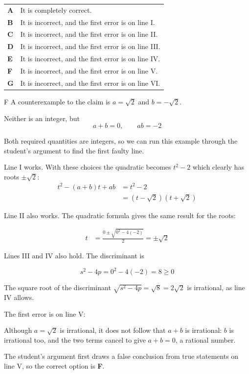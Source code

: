 \documentclass[11pt,a4paper]{article}
\begin{document}
\begin{enumerate}[label=\textbf{\arabic*.},leftmargin=*,itemsep=0pt,start=6]
\par\vspace*{12pt}
\begin{tabularx}{\linewidth}{@{}>{\bfseries}l Y@{}}
A &
It is completely correct.
\\[0.8em]
B &
It is incorrect, and the first error is on line I.
\\[0.8em]
C &
It is incorrect, and the first error is on line II.
\\[0.8em]
D &
It is incorrect, and the first error is on line III.
\\[0.8em]
E &
It is incorrect, and the first error is on line IV.
\\[0.8em]
F &
It is incorrect, and the first error is on line V.
\\[0.8em]
G &
It is incorrect, and the first error is on line VI.
\\
\end{tabularx}

\begin{djsSolution}{F}
A counterexample to the claim is $a=\sqrt2$ and $b=-\sqrt2$. 

Neither is an integer, but
\[
a+b=0,\qquad ab=-2
\]

Both required quantities are integers, so we can run this example through the student's argument to find the first faulty line.

Line I works. With these choices the quadratic becomes $t^2-2$ which clearly has roots $\pm\sqrt2$:
\begin{align*}
t^2-(a+b)t+ab&=t^2-2\\&=(t-\sqrt2)(t+\sqrt2)
\end{align*}

Line II also works. The quadratic formula gives the same result for the roots:

\begin{align*}
t&=\frac{0\pm\sqrt{0^2-4(-2)}}{2}=\pm\sqrt2
\end{align*}

Lines III and IV also hold. The discriminant is

\[
s^2-4p=0^2-4(-2)=8\geq0
\]

The square root of the discriminant \(\sqrt{s^2-4p} = \sqrt8=2\sqrt2 \) is irrational, as line IV allows.

The first error is on line V:

Although $a=\sqrt2$ is irrational, it does not follow that $a+b$ is irrational: $b$ is irrational too, and the two terms cancel to give $a+b=0$, a rational number.

The student's argument first draws a false conclusion from true statements on line V, so the correct option is \textbf{F}.
\end{djsSolution}
\end{enumerate}
\end{document}
